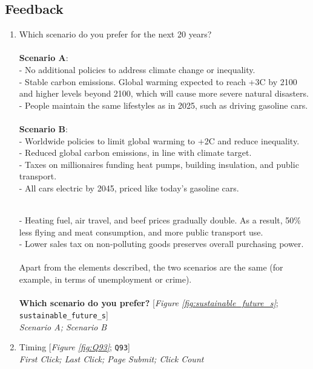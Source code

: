  \subsection*{Feedback} 
 \begin{enumerate}[resume] 
\item  \label{q:sustainable_future_s} Which scenario do you prefer for the next 20 years?\\\\\textbf{Scenario A}:\\- No additional policies to address climate change or inequality.~\\- Stable carbon emissions. Global warming expected to reach +3\textdegree{}C by 2100 and higher levels beyond 2100, which will cause more severe natural disasters.\\- People maintain the same lifestyles as in 2025, such as driving gasoline cars.\\\\\textbf{Scenario B}: \\- Worldwide policies to limit global warming to +2\textdegree{}C and reduce inequality. \\- Reduced global carbon emissions, in line with climate target. \\- Taxes on millionaires funding heat pumps, building insulation, and public transport. \\- All cars electric by 2045, priced like today's gasoline cars.

~\\- Heating fuel, air travel, and beef prices gradually double. As a result, 50\% less flying and meat consumption, and more public transport use. \\- Lower sales tax on non-polluting goods preserves overall purchasing power.\\\\Apart from the elements described, the two scenarios are the same (for example, in terms of unemployment or crime). \\\\\textbf{Which scenario do you prefer?} [\textit{Figure \ref{fig:sustainable_future_s}}; 
\verb|sustainable_future_s|]
  \\ \textit{Scenario A; Scenario B}

\item  \label{q:Q93} Timing [\textit{Figure \ref{fig:Q93}}; 
\verb|Q93|]
  \\ \textit{First Click; Last Click; Page Submit; Click Count}


\end{enumerate}
